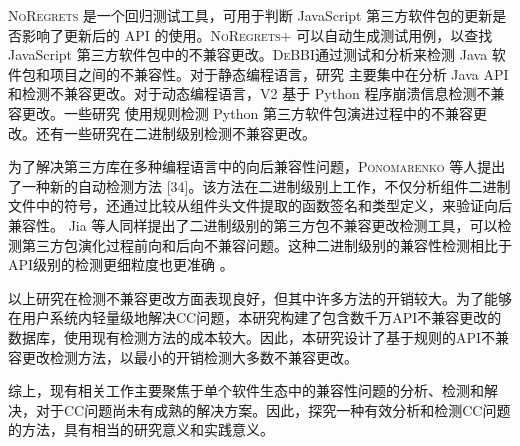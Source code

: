 \textsc{NoRegrets} 是一个回归测试工具，可用于判断 JavaScript 第三方软件包的更新是否影响了更新后的 API 的使用。\textsc{NoRegrets+} 可以自动生成测试用例，以查找 JavaScript 第三方软件包中的不兼容更改。\textsc{DeBBI}通过测试和分析来检测 Java 软件包和项目之间的不兼容性。对于静态编程语言，研究 主要集中在分析 Java API 和检测不兼容更改。对于动态编程语言，\textsc{V2}  基于 Python 程序崩溃信息检测不兼容更改。一些研究 使用规则检测 Python 第三方软件包演进过程中的不兼容更改。还有一些研究在二进制级别检测不兼容更改。

为了解决第三方库在多种编程语言中的向后兼容性问题，\textsc{Ponomarenko} 等人提出了一种新的自动检测方法 [34]。该方法在二进制级别上工作，不仅分析组件二进制文件中的符号，还通过比较从组件头文件提取的函数签名和类型定义，来验证向后兼容性。
Jia 等人同样提出了二进制级别的第三方包不兼容更改检测工具，可以检测第三方包演化过程前向和后向不兼容问题。这种二进制级别的兼容性检测相比于API级别的检测更细粒度也更准确 。

以上研究在检测不兼容更改方面表现良好，但其中许多方法的开销较大。为了能够在用户系统内轻量级地解决CC问题，本研究构建了包含数千万API不兼容更改的数据库，使用现有检测方法的成本较大。因此，本研究设计了基于规则的API不兼容更改检测方法，以最小的开销检测大多数不兼容更改。

综上，现有相关工作主要聚焦于单个软件生态中的兼容性问题的分析、检测和解决，对于CC问题尚未有成熟的解决方案。因此，探究一种有效分析和检测CC问题的方法，具有相当的研究意义和实践意义。


